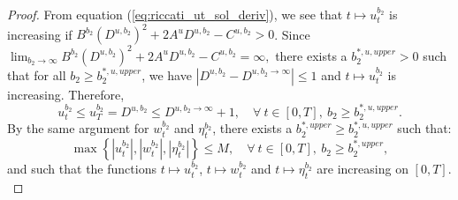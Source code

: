 \documentclass[11pt]{article}
\begin{document}
\begin{proof}
	From equation (\ref{eq:riccati_ut_sol_deriv}), we see that $t \mapsto u_t^{b_2}$ is increasing if $B^{b_2} (D^{u,b_2})^2 + 2 A^u D^{u,b_2} - C^{u,b_2} > 0$. Since 
	$\lim_{b_2 \to \infty} B^{b_2} (D^{u,b_2})^2 + 2 A^u D^{u,b_2} - C^{u,b_2} = \infty,$ there exists a $b_2^{*,u,upper} >0$ such that for all $b_2 \geq b_2^{*,u,upper}$, we have $|D^{u,b_2} -D^{u,b_2 \to \infty} | \leq 1$ and $t \mapsto u_t^{b_2}$ is increasing.
	Therefore,
	\begin{equation*}
	u_t^{b_2}\leq u_T^{b_2} = D^{u,b_2} \leq D^{u,b_2 \to \infty} + 1, \quad \forall \  t\in[0,T],\ b_2 \geq b_2^{*,u,upper}.
	\label{eq:u_t_bound}
	\end{equation*}
	By the same argument for $w_t^{b_2}$ and $\eta_t^{b_2}$, there exists a $b_2^{*,upper} \geq b_2^{*,u,upper}$ such that:
	\begin{equation}
	\max \left\{ \left\vert u_t^{b_2} \right\vert , \left\vert w_t^{b_2} \right\vert, \left\vert \eta_t^{b_2} \right\vert \right\} \leq M, \quad \forall \  t\in[0,T],\ b_2 \geq b_2^{*,upper},
	\label{eq:ut_wt_upper_bound_b2_infty}
	\end{equation}
	and such that the functions $t \mapsto u_t^{b_2}$, $t \mapsto w_t^{b_2}$ and $t \mapsto \eta_t^{b_2}$ are increasing on $[0,T]$. \\


\end{proof}
\end{document}
